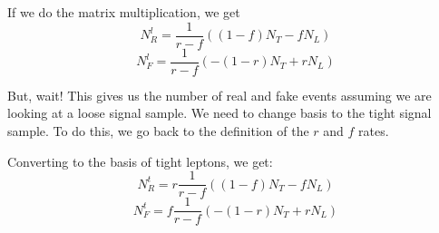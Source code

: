 \documentclass[11pt,a4paper]{article}
\begin{document}
  If we do the matrix multiplication, we get
  \[
    N_{R}^{l} = \frac{1}{r-f}\left( (1-f)N_T - fN_L \right)
  \]
  \[
    N_{F}^{l} = \frac{1}{r-f}\left( -(1-r)N_T + rN_L \right)
  \]

  But, wait!  This gives us the number of real and fake events assuming we are
  looking at a loose signal sample.  We need to change basis to the tight signal
  sample.  To do this, we go back to the definition of the $r$ and $f$ rates.  

  Converting to the basis of tight leptons, we get:
  \[
    N_{R}^{t} = r\frac{1}{r-f}\left( (1-f)N_T - fN_L \right)
  \]
  \[
    N_{F}^{t} = f\frac{1}{r-f}\left( -(1-r)N_T + rN_L \right)
  \]
\end{document}
